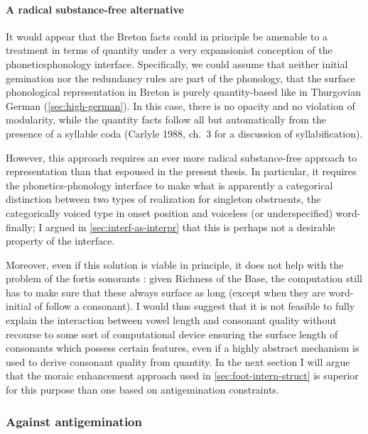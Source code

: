 \paragraph{A radical substance-free alternative}
\label{sec:radic-subst-free}

It would appear that the Breton facts could in principle be amenable to a treatment in terms of quantity under a very expansionist conception of the phonetics\endash phonology interface. Specifically, we could assume that neither initial gemination nor the redundancy rules are part of the phonology, \ie that the surface phonological representation in Breton is purely quantity\hyp based like in Thurgovian German (\cref{sec:high-german}). In this case, there is no opacity and no violation of modularity, while the quantity facts follow all but automatically from the presence of a syllable coda (\cf Carlyle 1988, ch.~3 for a discussion of syllabification).

However, this approach requires an ever more radical substance\hyp free approach to representation than that espoused in the present thesis. In particular, it requires the phonetics\hyp phonology interface to make what is apparently a categorical distinction between two types of realization for singleton obstruents, \ie the categorically voiced type in onset position and voiceless (or underspecified) word\hyp finally; I argued in \cref{sec:interf-as-interpr} that this is perhaps not a desirable property of the interface.

Moreover, even if this solution is viable in principle, it does not help with the problem of the fortis sonorants \ipa{[m~ɲ~ʎ]}: given Richness of the Base, the computation still has to make sure that these always surface as long (except when they are word\hyp initial of follow a consonant). I would thus suggest that it is not feasible to fully explain the interaction between vowel length and consonant quality without recourse to some sort of computational device ensuring the surface length of consonants which possess certain features, even if a highly abstract mechanism is used to derive consonant quality from quantity. In the next section I will argue that the moraic enhancement approach used in \cref{sec:foot-intern-struct} is superior for this purpose than one based on antigemination constraints.

\subsubsection{Against antigemination}
\label{sec:against-antig}

